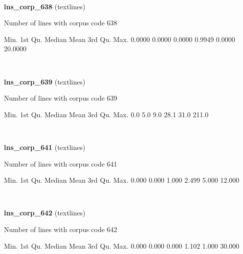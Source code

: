 \documentclass[]{article}
\newenvironment{Shaded}{\begin{snugshade}}{\end{snugshade}}
\newcommand{\FloatTok}[1]{\textcolor[rgb]{0.00,0.00,0.81}{{#1}}}
\newcommand{\NormalTok}[1]{{#1}}
\begin{document}
~

\vspace{1em}

\textbf{lns\_corp\_638} (textlines)

Number of lines with corpus code 638

\begin{Shaded}
\begin{Highlighting}[]
   \NormalTok{Min. 1st Qu.  Median    Mean 3rd Qu.    Max. }
 \FloatTok{0.0000}  \FloatTok{0.0000}  \FloatTok{0.0000}  \FloatTok{0.9949}  \FloatTok{0.0000} \FloatTok{20.0000} 
\end{Highlighting}
\end{Shaded}

~

\vspace{1em}

\textbf{lns\_corp\_639} (textlines)

Number of lines with corpus code 639

\begin{Shaded}
\begin{Highlighting}[]
   \NormalTok{Min. 1st Qu.  Median    Mean 3rd Qu.    Max. }
    \FloatTok{0.0}     \FloatTok{5.0}     \FloatTok{9.0}    \FloatTok{28.1}    \FloatTok{31.0}   \FloatTok{211.0} 
\end{Highlighting}
\end{Shaded}

~

\vspace{1em}

\textbf{lns\_corp\_641} (textlines)

Number of lines with corpus code 641

\begin{Shaded}
\begin{Highlighting}[]
   \NormalTok{Min. 1st Qu.  Median    Mean 3rd Qu.    Max. }
  \FloatTok{0.000}   \FloatTok{0.000}   \FloatTok{1.000}   \FloatTok{2.499}   \FloatTok{5.000}  \FloatTok{12.000} 
\end{Highlighting}
\end{Shaded}

~

\vspace{1em}

\textbf{lns\_corp\_642} (textlines)

Number of lines with corpus code 642

\begin{Shaded}
\begin{Highlighting}[]
   \NormalTok{Min. 1st Qu.  Median    Mean 3rd Qu.    Max. }
  \FloatTok{0.000}   \FloatTok{0.000}   \FloatTok{0.000}   \FloatTok{1.102}   \FloatTok{1.000}  \FloatTok{30.000} 
\end{Highlighting}
\end{Shaded}
\end{document}
